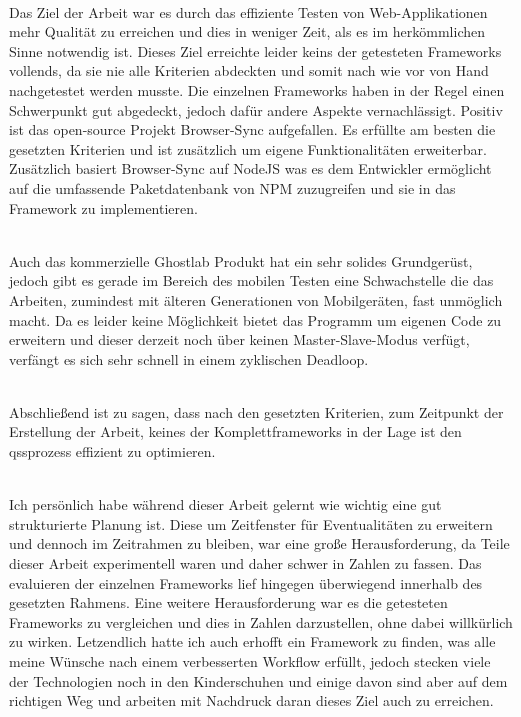 \\Das Ziel der Arbeit war es durch das effiziente Testen von Web-Applikationen mehr Qualität zu erreichen und dies in weniger Zeit, als es im herkömmlichen Sinne notwendig ist. Dieses Ziel erreichte leider keins der getesteten \Gls{Framework}s vollends, da sie nie alle Kriterien abdeckten und somit nach wie vor von Hand nachgetestet werden musste. 
Die einzelnen \Gls{Framework}s haben in der Regel einen Schwerpunkt gut abgedeckt, jedoch dafür andere Aspekte vernachlässigt. Positiv ist das open-source Projekt Browser-Sync aufgefallen. Es erfüllte am besten die gesetzten Kriterien und ist zusätzlich um eigene Funktionalitäten erweiterbar. Zusätzlich basiert Browser-Sync auf \gls{NodeJS} was es dem Entwickler ermöglicht auf die umfassende Paketdatenbank von \Gls{NPM} zuzugreifen und sie in das \Gls{Framework} zu implementieren. 

\\Auch das kommerzielle Ghostlab Produkt hat ein sehr solides Grundgerüst, jedoch gibt es gerade im Bereich des mobilen Testen eine Schwachstelle die das Arbeiten, zumindest mit älteren Generationen von Mobilgeräten, fast unmöglich macht. Da es leider keine Möglichkeit bietet das Programm um eigenen Code zu erweitern und dieser derzeit noch über keinen Master-Slave-Modus verfügt, verfängt es sich sehr schnell in einem zyklischen Deadloop.

\\Abschließend ist zu sagen, dass nach den gesetzten Kriterien, zum Zeitpunkt der Erstellung der Arbeit, keines der Komplettframeworks in der Lage ist den \Gls{qs}sprozess effizient zu optimieren.

\\Ich persönlich habe während dieser Arbeit gelernt wie wichtig eine gut strukturierte Planung ist. Diese um Zeitfenster für Eventualitäten zu erweitern und dennoch im Zeitrahmen zu bleiben, war eine große Herausforderung, da Teile dieser Arbeit experimentell waren und daher schwer in Zahlen zu fassen. Das evaluieren der einzelnen \Gls{Framework}s lief hingegen überwiegend innerhalb des gesetzten Rahmens. Eine weitere Herausforderung war es die getesteten \Gls{Framework}s zu vergleichen und dies in Zahlen darzustellen, ohne dabei willkürlich zu wirken. Letzendlich hatte ich auch erhofft ein \Gls{Framework} zu finden, was alle meine Wünsche nach einem verbesserten Workflow erfüllt, jedoch stecken viele der Technologien noch in den Kinderschuhen und einige davon sind aber auf dem richtigen Weg und arbeiten mit Nachdruck daran dieses Ziel auch zu erreichen.



